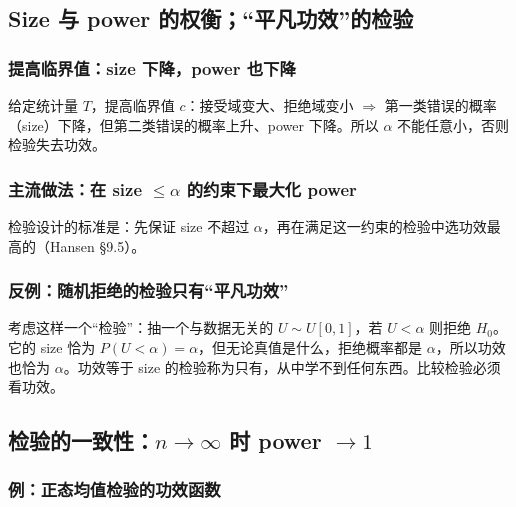 \subsection{Size 与 power 的权衡；“平凡功效”的检验}

\subsubsection{提高临界值：size 下降，power 也下降}

给定统计量 $T$，提高临界值 $c$：接受域变大、拒绝域变小 $\Rightarrow$ 第一类错误的概率（size）下降，但第二类错误的概率上升、power 下降。所以 $\alpha$ 不能任意小，否则检验失去功效。

\subsubsection{主流做法：在 size \texorpdfstring{$\le\alpha$}{<= alpha} 的约束下最大化 power}

检验设计的标准是：先保证 size 不超过 $\alpha$，再在满足这一约束的检验中选功效最高的（Hansen §9.5）。

\subsubsection{反例：随机拒绝的检验只有“平凡功效”}

\begin{note}
考虑这样一个“检验”：抽一个与数据无关的 $U\sim U[0,1]$，若 $U<\alpha$ 则拒绝 $H_0$。它的 size 恰为 $P(U<\alpha)=\alpha$，但无论真值是什么，拒绝概率都是 $\alpha$，所以功效也恰为 $\alpha$。功效等于 size 的检验称为只有，从中学不到任何东西。比较检验必须看功效。
\end{note}

\subsection{检验的一致性：\texorpdfstring{$n\to\infty$}{n -> infinity} 时 power \texorpdfstring{$\to1$}{-> 1}}

\subsubsection{例：正态均值检验的功效函数}

